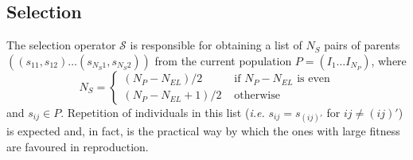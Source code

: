 \documentclass[10pt,a4paper,openany]{memoir}
\numberwithin{equation}{section}
\begin{document}





\subsection{Selection}
\label{sec:ga-selection}

The selection operator $\mathcal{S}$ is responsible for obtaining a list of $N_S$ pairs of parents
$((s_{11},s_{12})\ldots (s_{N_S 1},s_{N_S 2}))$ from the current population $P=(I_1\ldots I_{N_P})$, where
\begin{equation}
  \label{eq:ga-selection-number}
  N_S = \left\{
    \begin{array}{rl}
      (N_P-N_{EL})/2 & \text{ if } N_P - N_{EL}\text{ is even} \\
      (N_P-N_{EL}+1)/2 & \text{ otherwise }
    \end{array}
  \right.
\end{equation}
and $s_{ij} \in P$.  Repetition of individuals in this list (\textit{i.e.}
$s_{ij} = s_{(ij)'}$ for $ij \neq (ij)'$) is expected and, in fact, is the
practical way by which the ones with large fitness are favoured in reproduction.
\end{document}
